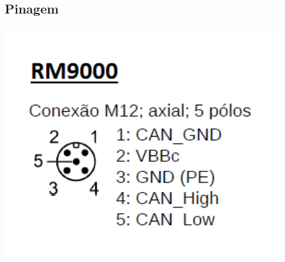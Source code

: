 \begin{appendices}
\subsection{Pinagem}
\includegraphics[width=1\columnwidth]{figs/datasheets/pinout.pdf}

\end{appendices}

